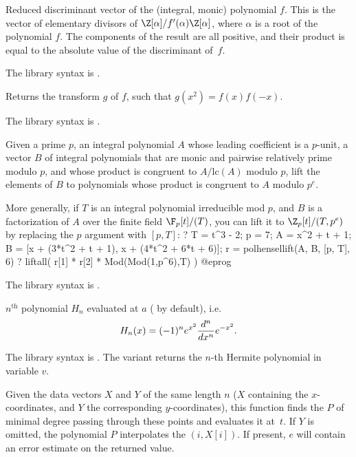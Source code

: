 \label{se:poldiscreduced}
Reduced discriminant vector of the
(integral, monic) polynomial $f$. This is the vector of elementary divisors
of $\Z[\alpha]/f'(\alpha)\Z[\alpha]$, where $\alpha$ is a root of the
polynomial $f$. The components of the result are all positive, and their
product is equal to the absolute value of the discriminant of~$f$.

The library syntax is .

\label{se:polgraeffe}
Returns the  transform $g$ of $f$, such that $g(x^2) = f(x)
f(-x)$.

The library syntax is .

\label{se:polhensellift}
Given a prime $p$, an integral polynomial $A$ whose leading coefficient
is a $p$-unit, a vector $B$ of integral polynomials that are monic and
pairwise relatively prime modulo $p$, and whose product is congruent to
$A/\text{lc}(A)$ modulo $p$, lift the elements of $B$ to polynomials whose
product is congruent to $A$ modulo $p^e$.

More generally, if $T$ is an integral polynomial irreducible mod $p$, and
$B$ is a factorization of $A$ over the finite field $\F_p[t]/(T)$, you can
lift it to $\Z_p[t]/(T, p^e)$ by replacing the $p$ argument with $[p,T]$:
\bprog
? { T = t^3 - 2; p = 7; A = x^2 + t + 1;
    B = [x + (3*t^2 + t + 1), x + (4*t^2 + 6*t + 6)];
    r = polhensellift(A, B, [p, T], 6) }
? liftall( r[1] * r[2] * Mod(Mod(1,p^6),T) )
@eprog

The library syntax is .

\label{se:polhermite}
$n^{\text{th}}$  polynomial $H_n$ evaluated at $a$
( by default), i.e.
$$ H_n(x) = (-1)^n\*e^{x^2} \dfrac{d^n}{dx^n}e^{-x^2}.$$

The library syntax is .
The variant  returns the $n$-th
Hermite polynomial in variable $v$.

\label{se:polinterpolate}
Given the data vectors
$X$ and $Y$ of the same length $n$ ($X$ containing the $x$-coordinates,
and $Y$ the corresponding $y$-coordinates), this function finds the
 $P$ of minimal degree passing through these
points and evaluates it at~$t$. If $Y$ is omitted, the polynomial $P$
interpolates the $(i,X[i])$. If present, $e$ will contain an error estimate
on the returned value.

